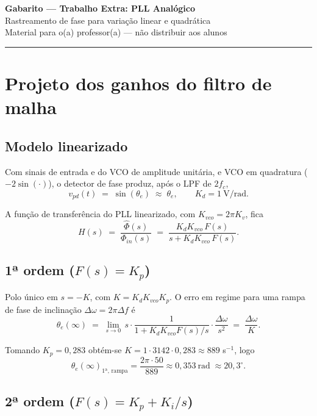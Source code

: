 \documentclass[11pt,a4paper]{article}
\begin{document}
\begin{center}
{\Large\textbf{Gabarito --- Trabalho Extra: PLL Analógico}}\\[0.2cm]
{\large Rastreamento de fase para variação linear e quadrática}\\[0.1cm]
{\small Material para o(a) professor(a) --- não distribuir aos alunos}
\end{center}

\hrule
\vspace{0.4em}

\section{Projeto dos ganhos do filtro de malha}

\subsection{Modelo linearizado}

Com sinais de entrada e do VCO de amplitude unitária, e VCO em quadratura
($-2\sin(\cdot)$), o detector de fase produz, após o LPF de $2f_c$,
\[
  v_{pd}(t) \;=\; \sin(\theta_e) \;\approx\; \theta_e, \qquad K_d = 1\ \text{V/rad}.
\]

A função de transferência do PLL linearizado, com $K_{vco}=2\pi K_v$, fica
\[
  H(s) \;=\; \frac{\hat\Phi(s)}{\Phi_{in}(s)} \;=\; \frac{K_d K_{vco}\,F(s)}{s + K_d K_{vco}\,F(s)}.
\]

\subsection{1ª ordem ($F(s) = K_p$)}

Polo único em $s=-K$, com $K = K_d K_{vco} K_p$. O erro em regime para uma rampa de fase de
inclinação $\Delta\omega = 2\pi\Delta f$ é
\[
  \theta_e(\infty) \;=\; \lim_{s\to 0}\, s\cdot\frac{1}{1+K_d K_{vco} F(s)/s}\cdot\frac{\Delta\omega}{s^2}
                   \;=\; \frac{\Delta\omega}{K}.
\]

Tomando $K_p = 0{,}283$ obtém-se $K = 1\cdot 3142\cdot 0{,}283 \approx 889$ s$^{-1}$, logo
\[
  \boxed{\theta_e(\infty)_{\text{1ª, rampa}} = \frac{2\pi\cdot 50}{889} \approx 0{,}353\ \text{rad} \;\approx 20{,}3^\circ.}
\]

\subsection{2ª ordem ($F(s) = K_p + K_i/s$)}
\end{document}
